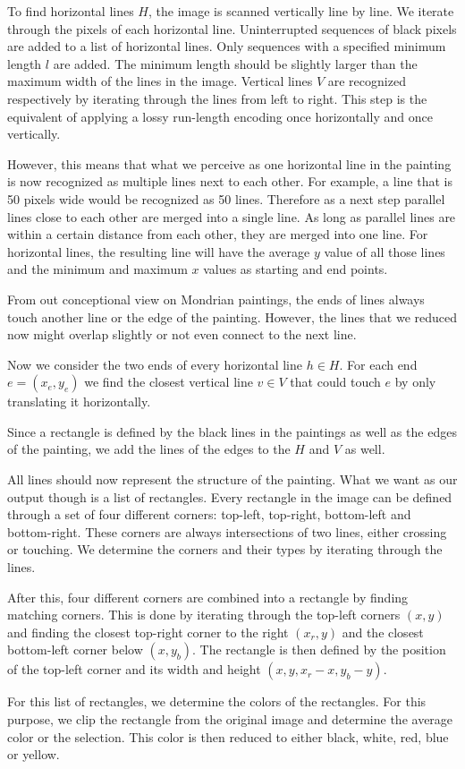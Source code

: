 To find horizontal lines $H$, the image is scanned vertically line by line. We
iterate through the pixels of each horizontal line. Uninterrupted sequences of
black pixels are added to a list of horizontal lines. Only sequences with a
specified minimum length $l$ are added. The minimum length should be slightly
larger than the maximum width of the lines in the image. Vertical lines $V$ are
recognized respectively by iterating through the lines from left to right. This
step is the equivalent of applying a lossy run-length encoding once horizontally
and once vertically.

However, this means that what we perceive as one horizontal line in the painting
is now recognized as multiple lines next to each other. For example, a line that
is 50 pixels wide would be recognized as 50 lines. Therefore as a next step
parallel lines close to each other are merged into a single line. As long as
parallel lines are within a certain distance from each other, they are merged
into one line. For horizontal lines, the resulting line will have the average
$y$ value of all those lines and the minimum and maximum $x$ values as starting
and end points.

From out conceptional view on Mondrian paintings, the ends of lines always touch
another line or the edge of the painting. However, the lines that we reduced now
might overlap slightly or not even connect to the next line.

Now we consider the two ends of every horizontal line $h \in H$. For each end $e =
(x_e,y_e)$ we find the closest vertical line $v \in V$ that could touch $e$ by only
translating it horizontally.

Since a rectangle is defined by the black lines in the paintings as well as the
edges of the painting, we add the lines of the edges to the $H$ and $V$ as well.


All lines should now represent the structure of the painting. What we want as
our output though is a list of rectangles. Every rectangle in the image can be
defined through a set of four different corners: top-left, top-right,
bottom-left and bottom-right. These corners are always intersections of two
lines, either crossing or touching. We determine the corners and their types by
iterating through the lines.

After this, four different corners are combined into a rectangle by finding
matching corners. This is done by iterating through the top-left corners $(x,y)$
and finding the closest top-right corner to the right $(x_r, y)$ and the
closest bottom-left corner below $(x, y_b)$. The rectangle is then defined by
the position of the top-left corner and its width and height
$(x,y,x_r-x,y_b-y)$.

For this list of rectangles, we determine the colors of the rectangles. For this
purpose, we clip the rectangle from the original image and determine the average
color or the selection. This color is then reduced to either black, white, red,
blue or yellow.
